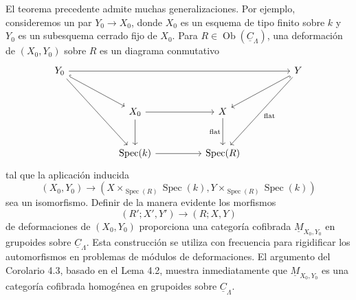 El teorema precedente admite muchas generalizaciones. Por ejemplo,
consideremos un par $Y_0\longrightarrow X_0$, donde $X_0$ es un
esquema de tipo finito sobre $k$ y $Y_0$ es un subesquema cerrado fijo
de $X_0$. Para
$R\in\operatorname{Ob}(\underline C_\Lambda)$, una deformación de
$(X_0,Y_0)$ sobre $R$ es un diagrama conmutativo
\[
\begin{tikzcd}[row sep=large,column sep=huge]
Y_0 \arrow[rrr] \arrow[dr,hook] \arrow[ddr]
&&& Y \arrow[dl,hook] \arrow[ddl,"\mathrm{flat}"] \\
& X_0 \arrow[r] \arrow[d]
& X \sisi{\arrow[d,no head,"\mathrm{flat}"']}{\arrow[d,"\mathrm{flat}"']} & \\
& \operatorname{Spec}(k) \arrow[r]
& \operatorname{Spec}(R) &
\end{tikzcd}
\]
tal que la aplicación inducida
\[
(X_0,Y_0)\longrightarrow
\left(
 X\times_{\operatorname{Spec}(R)}\operatorname{Spec}(k),
 Y\times_{\operatorname{Spec}(R)}\operatorname{Spec}(k)
\right)
\]
sea un isomorfismo. Definir de la manera evidente los morfismos
\[
(R';X',Y')\longrightarrow(R;X,Y)
\]
de deformaciones de $(X_0,Y_0)$ proporciona una categoría cofibrada
$\underline M_{X_0,Y_0}$ en grupoides sobre
$\underline C_\Lambda$. Esta construcción se utiliza con frecuencia
para rigidificar los automorfismos en problemas de módulos de
deformaciones. El argumento del Corolario 4.3, basado en el Lema 4.2,
muestra inmediatamente que $\underline M_{X_0,Y_0}$ es una categoría
cofibrada homogénea en grupoides sobre $\underline C_\Lambda$.
